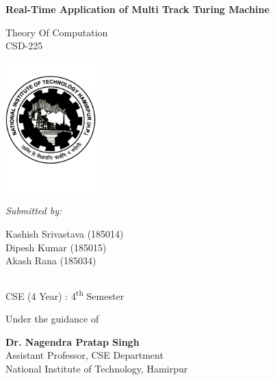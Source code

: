 \documentclass[11pt,a4paper]{report}
\begin{document}
\begin{titlepage}
    \begin{center}

        \Huge{\textbf{Real-Time Application of Multi Track Turing Machine}}
 
        \vspace{0.5cm}
        
        \normalsize
       
        \vspace{10pt}
        
        Theory Of Computation\\
        CSD-225

        
        
        \vspace{15pt}
        \includegraphics[height=5cm]{images/nith-logo.png}
        
        \vspace{10pt}
        \textit{Submitted by:}

            Kashish Srivastava (185014)\\
            Dipesh Kumar (185015)\\
            Akash Rana (185034)
        \vspace{5pt}
        
        \begin{tabular}{c c}
            
        \end{tabular}
 
        \vspace{5pt}
        CSE (4 Year) : 
        4\textsuperscript{th} Semester
 
        \vspace{15pt}
 
        Under the guidance of
        
        \vspace{5pt}
        
        \textbf{Dr. Nagendra Pratap Singh }\\
        Assistant Professor, CSE Department\\
        National Institute of Technology, Hamirpur\\
 

\end{center}
\end{titlepage}
\end{document}
